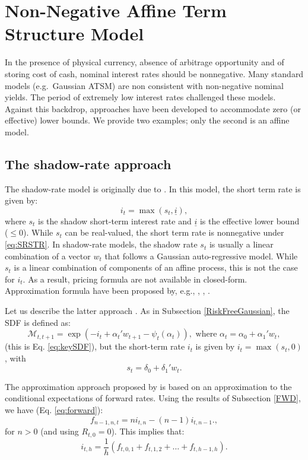 \documentclass[
  12pt,
]{book}
\theoremstyle{definition}
\theoremstyle{definition}
\theoremstyle{definition}
\theoremstyle{definition}
\theoremstyle{remark}
\begin{document}
\hypertarget{RiskFreeNonNegative}{%
\section{Non-Negative Affine Term Structure Model}\label{RiskFreeNonNegative}}

In the presence of physical currency, absence of arbitrage opportunity and of storing cost of cash, nominal interest rates should be nonnegative. Many standard models (e.g.~Gaussian ATSM) are non consistent with non-negative nominal yields. The period of extremely low interest rates challenged these models. Against this backdrop, approaches have been developed to accommodate zero (or effective) lower bounds. We provide two examples; only the second is an affine model.

\hypertarget{Shadowrate}{%
\subsection{The shadow-rate approach}\label{Shadowrate}}

The shadow-rate model is originally due to \citet{Black_1995}. In this model, the short term rate is given by:
\begin{equation}
i_t = \max(s_t,\underline{i}),\label{eq:SRSTR}
\end{equation}
where \(s_t\) is the shadow short-term interest rate and \(\underline{i}\) is the effective lower bound (\(\le 0\)). While \(s_t\) can be real-valued, the short term rate is nonnegative under \eqref{eq:SRSTR}. In shadow-rate models, the shadow rate \(s_t\) is usually a linear combination of a vector \(w_t\) that follows a Gaussian auto-regressive model. While \(s_t\) is a linear combination of components of an affine process, this is not the case for \(i_t\). As a result, pricing formula are not available in closed-form. Approximation formula have been proposed by, e.g., \citet{Krippner_2013}, \citet{Priebsch_2013}, \citet{Wu_Xia_2016}.

Let us describe the latter approach \citep{Wu_Xia_2016}. As in Subsection \ref{RiskFreeGaussian}, the SDF is defined as:
\[
\mathcal{M}_{t,t+1} = \exp(- i_t + \alpha_t'w_{t+1} - \psi_t(\alpha_t)), \mbox{ where } \alpha_t = \alpha_0 + \alpha_1'w_t,
\]
(this is Eq. \eqref{eq:keySDF}), but the short-term rate \(i_t\) is given by \(i_t = \max(s_t,0)\), with
\[
s_t = \delta_0 + \delta_1' w_t.
\]

The approximation approach proposed by \citet{Wu_Xia_2016} is based on an approximation to the conditional expectations of forward rates. Using the results of Subsection \ref{FWD}, we have (Eq. \eqref{eq:forward}):
\[
f_{n-1,n,t} = n i_{t,n} - (n-1) i_{t,n-1}.,
\]
for \(n>0\) (and using \(R_{t,0}=0\)). This implies that:
\[
i_{t,h} =  \frac{1}{h}(f_{t,0,1}+f_{t,1,2}+\dots+f_{t,h-1,h}).
\]
\end{document}
